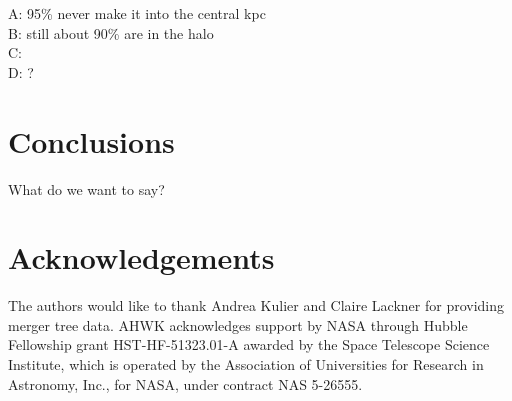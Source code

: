 \documentclass[english, apj]{emulateapj}
\begin{document}
A: 95\% never make it into the central kpc\\
B: still about 90\% are in the halo\\
C: \\
D: ?



\section{Conclusions}\label{sec:conclusions}
What do we want to say?



\section*{Acknowledgements}

The authors would like to thank Andrea Kulier and Claire Lackner for providing merger tree data. AHWK acknowledges support by NASA through Hubble Fellowship grant HST-HF-51323.01-A awarded by the Space Telescope Science Institute, which is operated by the Association of Universities for Research in Astronomy, Inc., for NASA, under contract NAS 5-26555. 








\end{document}
